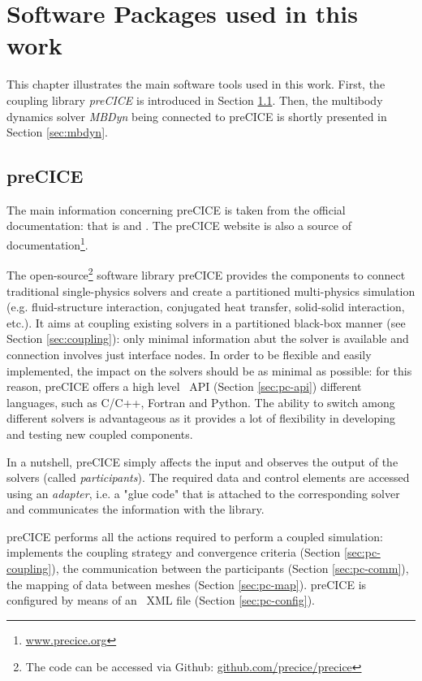 \chapter{Software Packages used in this work}
\label{cha:software}

This chapter illustrates the main software tools used in this work. First, the coupling library \textit{preCICE} is introduced in Section \ref{sec:precice}. Then, the multibody dynamics solver \textit{MBDyn} being connected to preCICE is shortly presented in Section \ref{sec:mbdyn}.


\section{preCICE}
\label{sec:precice}

The main information concerning preCICE is taken from the official documentation: that is \cite{gatzhammer2014efficient} and  \cite{bungartz2016precice}. The preCICE website is also a source of documentation\footnote{\href{http://www.precice.org}{www.precice.org}}.

The open-source\footnote{The code can be accessed via Github: \href{https://github.com/precice/precice}{github.com/precice/precice}} software library preCICE provides the components to connect traditional single-physics solvers and create a partitioned multi-physics simulation (e.g. fluid-structure interaction, conjugated heat transfer, solid-solid interaction, etc.).
It aims at coupling existing solvers in a partitioned black-box manner (see Section \ref{sec:coupling}):  only minimal information abut the solver is available and connection involves just interface nodes. 
In order to be flexible and easily implemented, the impact on the solvers should be as minimal as possible: for this reason, preCICE offers a high level ~\ac{API} (Section \ref{sec:pc-api}) different languages, such as C/C++, Fortran and Python.
The ability to switch among different solvers is advantageous as it provides a lot of flexibility in developing and testing new coupled components.

In a nutshell, preCICE simply affects the input and observes the output of the solvers (called \textit{participants}). The required data and control elements are accessed using an \textit{adapter}, i.e. a "glue code" that is attached to the corresponding solver and communicates the information with the library.

preCICE performs all the actions required to perform a coupled simulation: implements the coupling strategy and convergence criteria (Section \ref{sec:pc-coupling}), the communication
between the participants (Section \ref{sec:pc-comm}), the mapping of data between meshes (Section \ref{sec:pc-map}). preCICE is configured by means of an ~\ac{XML} file (Section \ref{sec:pc-config}).




